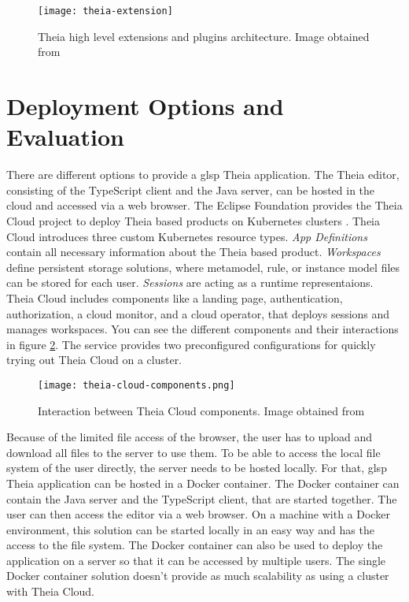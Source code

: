   \begin{figure}[h]
    \centering
    \texttt{[image: theia-extension]}
    \caption{Theia high level extensions and plugins architecture. Image obtained from \cite{theia-doc}}
    \label{fig:theia-extensions}
  \end{figure}


  \section{Deployment Options and Evaluation}
  \label{sec:deployment-evaluation}

  
  There are different options to provide a \ac{glsp} Theia application. The Theia editor, consisting of the TypeScript client and the Java server, can be hosted in the cloud and accessed via a web browser. The Eclipse Foundation provides the Theia Cloud project \cite{theia-cloud-doc} to deploy Theia based products on Kubernetes clusters \cite{kubernetes}. Theia Cloud introduces three custom Kubernetes resource types. \textit{App Definitions} contain all necessary information about the Theia based product. \textit{Workspaces} define persistent storage solutions, where metamodel, rule, or instance model files can be stored for each user. \textit{Sessions} are acting as a runtime representaions. Theia Cloud includes components like a landing page, authentication, authorization, a cloud monitor, and a cloud operator, that deploys sessions and manages workspaces. You can see the different components and their interactions in figure \ref{fig:theia-cloud-components}. The service provides two preconfigured configurations for quickly trying out Theia Cloud on a cluster. \cite{theia-cloud-doc}

  \begin{figure}[h]
    \centering
    \texttt{[image: theia-cloud-components.png]}
    \caption{Interaction between Theia Cloud components. Image obtained from \cite{theia-cloud-doc}}
    \label{fig:theia-cloud-components}
  \end{figure}

  Because of the limited file access of the browser, the user has to upload and download all files to the server to use them. To be able to access the local file system of the user directly, the server needs to be hosted locally. For that, \ac{glsp} Theia application can be hosted in a Docker container. \cite{docker} The Docker container can contain the Java server and the TypeScript client, that are started together. The user can then access the editor via a web browser. On a machine with a Docker environment, this solution can be started locally in an easy way and has the access to the file system. The Docker container can also be used to deploy the application on a server so that it can be accessed by multiple users. The single Docker container solution doesn't provide as much scalability as using a cluster with Theia Cloud.

